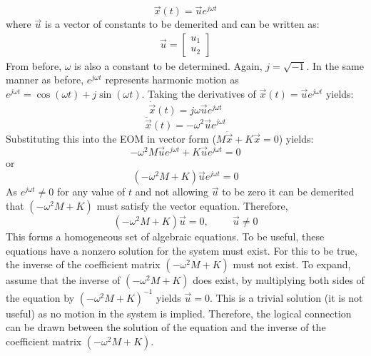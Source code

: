 \documentclass[12pt,letter]{article}
\begin{document}
	\begin{equation}
		\vec{x}(t) = \vec{u}e^{j\omega t}
	\end{equation}
	where $\vec{u}$ is a vector of constants to be demerited and can be written as:
	\begin{eqnarray}
	\vec{u}=  \begin{bmatrix} u_1 \\  u_2 \end{bmatrix}
	\end{eqnarray}
	From before, $\omega$ is also a constant to be determined. Again, $j=\sqrt{-1}$. In the same manner as before, $e^{j\omega t}$ represents harmonic motion as $e^{j\omega t} = \cos(\omega t) + j \sin(\omega t)$. Taking the derivatives of $\vec{x}(t) = \vec{u}e^{j\omega t}$ yields:
	\begin{equation}
		\dot{\vec{x}}(t) = j\omega\vec{u}e^{j\omega t}
	\end{equation}
	\begin{equation}
		\ddot{\vec{x}}(t) = -\omega^2\vec{u}e^{j\omega t}
	\end{equation}
	Substituting this into the EOM in vector form ($M\ddot{\vec{x}} + K\vec{x} =0$) yields:
	\begin{equation}
	-\omega^2 M  \vec{u}e^{j\omega t} + K\vec{u}e^{j\omega t} =0
	\end{equation}
	or 
	\begin{equation}
	(-\omega^2 M  + K)\vec{u}e^{j\omega t} =0
	\end{equation}
	As $e^{j\omega t} \neq 0$ for any value of $t$ and not allowing $\vec{u}$ to be zero it can be demerited that $(-\omega^2 M  + K)$ must satisfy the vector equation. Therefore,
	\begin{equation}
	(-\omega^2 M  + K)\vec{u} =0, \hspace{1cm} \vec{u}\neq0
	\end{equation}
	This forms a homogeneous set of algebraic equations. To be useful, these equations have a nonzero solution for the system must exist. For this to be true, the inverse of the coefficient matrix $(-\omega^2 M  + K)$ must not exist. To expand, assume that the inverse of $(-\omega^2 M  + K)$ does exist, by multiplying both sides of the equation by $(-\omega^2 M  + K)^{-1}$ yields $\vec{u}=0$. This is a trivial solution (it is not useful) as no motion in the system is implied. Therefore, the logical connection can be drawn between the solution of the equation and the inverse of the coefficient matrix $(-\omega^2 M  + K)$.
	
\end{document}
